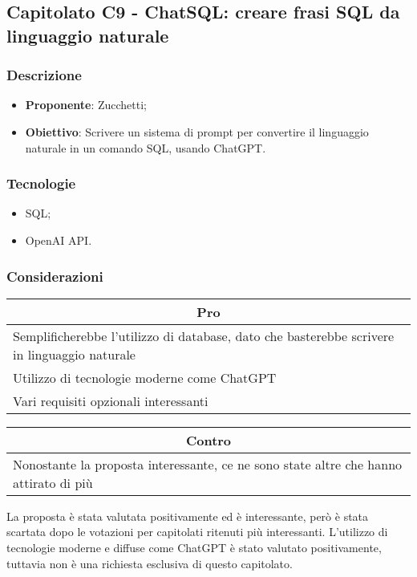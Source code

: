 \subsection{Capitolato C9 - ChatSQL: creare frasi SQL da linguaggio naturale}


\subsubsection{Descrizione}
\begin{itemize}
    \item \textbf{Proponente}: Zucchetti;
    \item \textbf{Obiettivo}: Scrivere un sistema di prompt per convertire il linguaggio naturale in un comando SQL, usando ChatGPT.
\end{itemize}


\subsubsection{Tecnologie}
\begin{itemize}
    \item SQL;
    \item OpenAI API.
\end{itemize}


\subsubsection{Considerazioni}
\begin{minipage}[t]{0.45\linewidth}
    \vspace{0pt}
    {\renewcommand{\arraystretch}{1.5}
    \begin{tabular}{p{1\linewidth}}
        \multicolumn{1}{c}{\textbf{Pro}} \\
        \midrule
        Semplificherebbe l'utilizzo di database, dato che basterebbe scrivere in linguaggio naturale \\
        Utilizzo di tecnologie moderne come ChatGPT \\
        Vari requisiti opzionali interessanti \\
        \hline
    \end{tabular}
    }
\end{minipage}
\hspace{0.05\linewidth}
\begin{minipage}[t]{0.45\linewidth}
    \vspace{0pt}
    {\renewcommand{\arraystretch}{1.5}
    \begin{tabular}{p{1\linewidth}}
        \multicolumn{1}{c}{\textbf{Contro}} \\
        \midrule
        Nonostante la proposta interessante, ce ne sono state altre che hanno attirato di più \\
        \hline
    \end{tabular}
    }
\end{minipage}
\vspace{1em}

La proposta è stata valutata positivamente ed è interessante, però è stata scartata dopo le votazioni per capitolati ritenuti più interessanti.
L'utilizzo di tecnologie moderne e diffuse come ChatGPT è stato valutato positivamente, tuttavia non è una richiesta esclusiva di questo capitolato.